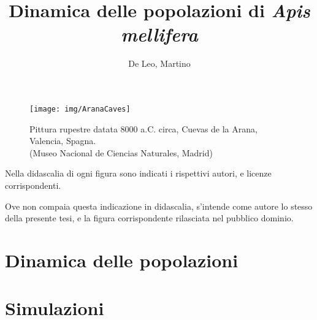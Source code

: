 \documentclass[12pt,a4paper,oneside,hidelinks]{book} %
\author{De Leo, Martino}
\title{Dinamica delle popolazioni di \emph{Apis mellifera} }
\begin{document}
\maketitle %

\frontmatter


\pagebreak



\begin{figure}[hbp]
    \centering
    \texttt{[image: img/AranaCaves]}

    \caption[Pittura rupestre di Arana.]{Pittura rupestre datata 8000 a.C. circa, Cuevas de la Arana, Valencia, Spagna. \\ (Museo Nacional de Ciencias Naturales, Madrid)}
    \label{img:arana}
\end{figure}

\cleardoublepage
\tableofcontents

\listoffigures
Nella didascalia di ogni figura sono indicati i rispettivi autori, e licenze corrispondenti.

Ove non compaia questa indicazione in didascalia, s'intende come autore lo stesso della presente tesi, e la figura
corrispondente rilasciata nel pubblico dominio.

\listoftables


\mainmatter

\clearpage
\part{Dinamica delle popolazioni}







\part{Simulazioni}







\appendix



\backmatter



\cleardoublepage
{}
\nocite{*} %
\printbibliography
\end{document}
